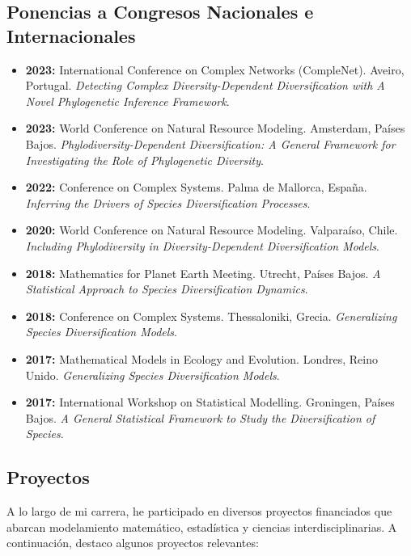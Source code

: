 \documentclass[11pt,a4paper]{article}
\begin{document}
\subsection{Ponencias a Congresos Nacionales e Internacionales}
\begin{itemize}
    \item \textbf{2023:} International Conference on Complex Networks (CompleNet). Aveiro, Portugal. \textit{Detecting Complex Diversity-Dependent Diversification with A Novel Phylogenetic Inference Framework}.
    \item \textbf{2023:} World Conference on Natural Resource Modeling. Amsterdam, Países Bajos. \textit{Phylodiversity-Dependent Diversification: A General Framework for Investigating the Role of Phylogenetic Diversity}.
    \item \textbf{2022:} Conference on Complex Systems. Palma de Mallorca, España. \textit{Inferring the Drivers of Species Diversification Processes}.
    \item \textbf{2020:} World Conference on Natural Resource Modeling. Valparaíso, Chile. \textit{Including Phylodiversity in Diversity-Dependent Diversification Models}.
    \item \textbf{2018:} Mathematics for Planet Earth Meeting. Utrecht, Países Bajos. \textit{A Statistical Approach to Species Diversification Dynamics}.
    \item \textbf{2018:} Conference on Complex Systems. Thessaloniki, Grecia. \textit{Generalizing Species Diversification Models}.
    \item \textbf{2017:} Mathematical Models in Ecology and Evolution. Londres, Reino Unido. \textit{Generalizing Species Diversification Models}.
    \item \textbf{2017:} International Workshop on Statistical Modelling. Groningen, Países Bajos. \textit{A General Statistical Framework to Study the Diversification of Species}.
\end{itemize}



\subsection{Proyectos}
A lo largo de mi carrera, he participado en diversos proyectos financiados que abarcan modelamiento matemático, estadística y ciencias interdisciplinarias. A continuación, destaco algunos proyectos relevantes:
\end{document}

